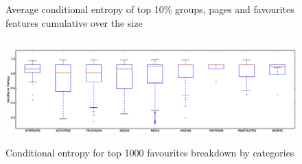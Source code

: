 \begin{figure}[h]
\begin{tabular}{ccc}
\end{tabular}
\caption{Average conditional entropy of top 10\% groups, pages and favourites features cumulative over the size }
\label{Fig4}
\end{figure}

\begin{figure}
\centering
\includegraphics[width=180mm, height=40mm]{data/plots/boxPlots/CEvsFavTypes.eps}
\caption{Conditional entropy for top 1000 favourites breakdown by categories}
\label{Fig5}
\end{figure}

